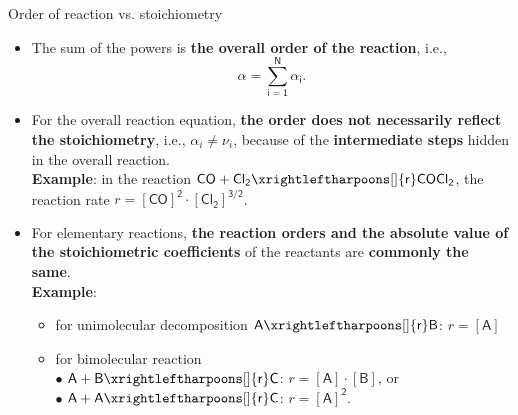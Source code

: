 %
\begin{frame}{Order of reaction vs. stoichiometry}
	\small
	\begin{itemize}
	\item The sum of the powers is \alert{\bf the overall order of the reaction}, i.e., 
	\[\mathsf{\alpha = \sum_{i=1}^{N} \alpha_i}.\]
	\pause
	\item For the overall reaction equation, \alert{\bf the order does not necessarily reflect the stoichiometry}, i.e., 
	$\alpha_i \neq \nu_i$,
	because of the {\bf intermediate steps} hidden in the overall reaction.\\[5pt]
	{\bf Example}: in the reaction $\mathsf{CO + Cl_2 \xrightleftharpoons[]{r} COCl_2}$, the reaction rate $r = \mathsf{[CO]^2 \cdot [Cl_2]^{3/2}}$.
	\pause
	\vskip -5pt
	\pause
	\item For elementary reactions, {\bf the reaction orders and the absolute value of the stoichiometric
coefficients} of the reactants are \alert{\bf commonly the same}. \\[5pt]
%
    {\bf Example}:
	\begin{itemize}
	\item for unimolecular decomposition $\mathsf{A \xrightleftharpoons[]{r} B}$: $r = \mathsf{[A]}$
	\item for bimolecular reaction \\[5pt]
 	$\bullet$ $\mathsf{A + B \xrightleftharpoons[]{r} C}$: $r = \mathsf{[A] \cdot [B]}$, or \\
	$\bullet$ $\mathsf{A + A \xrightleftharpoons[]{r} C}$: $r = \mathsf{[A]^2}$.
	\end{itemize}
\end{itemize}
\end{frame}
%
